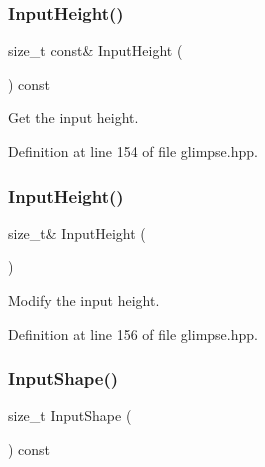 \subsubsection{Input\+Height()\hspace{0.1cm}{\footnotesize\ttfamily [1/2]}}
{\footnotesize\ttfamily size\+\_\+t const\& Input\+Height (\begin{DoxyParamCaption}{ }\end{DoxyParamCaption}) const\hspace{0.3cm}{\ttfamily [inline]}}



Get the input height. 



Definition at line 154 of file glimpse.\+hpp.

\mbox{\label{classmlpack_1_1ann_1_1Glimpse_aefbba724eec397a928d5460bb209a360}} 
\subsubsection{Input\+Height()\hspace{0.1cm}{\footnotesize\ttfamily [2/2]}}
{\footnotesize\ttfamily size\+\_\+t\& Input\+Height (\begin{DoxyParamCaption}{ }\end{DoxyParamCaption})\hspace{0.3cm}{\ttfamily [inline]}}



Modify the input height. 



Definition at line 156 of file glimpse.\+hpp.

\mbox{\label{classmlpack_1_1ann_1_1Glimpse_a13ab93f234244a68f6ade76287284447}} 
\subsubsection{Input\+Shape()}
{\footnotesize\ttfamily size\+\_\+t Input\+Shape (\begin{DoxyParamCaption}{ }\end{DoxyParamCaption}) const\hspace{0.3cm}{\ttfamily [inline]}}



